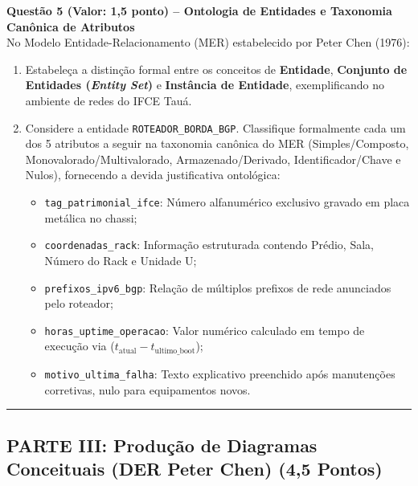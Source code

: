 \documentclass[11pt,a4paper]{article}
\begin{document}
\vspace{0.3cm}
\noindent\textbf{Questão 5 (Valor: 1,5 ponto) -- Ontologia de Entidades e Taxonomia Canônica de Atributos}\\[0.1cm]
No Modelo Entidade-Relacionamento (MER) estabelecido por Peter Chen (1976):
\begin{enumerate}[label=\alph*),itemsep=1pt]
  \item Estabeleça a distinção formal entre os conceitos de \textbf{Entidade}, \textbf{Conjunto de Entidades (\textit{Entity Set})} e \textbf{Instância de Entidade}, exemplificando no ambiente de redes do IFCE Tauá.
  \item Considere a entidade \texttt{ROTEADOR\_BORDA\_BGP}. Classifique formalmente cada um dos 5 atributos a seguir na taxonomia canônica do MER (Simples/Composto, Monovalorado/Multivalorado, Armazenado/Derivado, Identificador/Chave e Nulos), fornecendo a devida justificativa ontológica:
  \begin{itemize}[itemsep=1pt]
    \item \texttt{tag\_patrimonial\_ifce}: Número alfanumérico exclusivo gravado em placa metálica no chassi;
    \item \texttt{coordenadas\_rack}: Informação estruturada contendo Prédio, Sala, Número do Rack e Unidade U;
    \item \texttt{prefixos\_ipv6\_bgp}: Relação de múltiplos prefixos de rede anunciados pelo roteador;
    \item \texttt{horas\_uptime\_operacao}: Valor numérico calculado em tempo de execução via ($t_{\text{atual}} - t_{\text{ultimo\_boot}}$);
    \item \texttt{motivo\_ultima\_falha}: Texto explicativo preenchido após manutenções corretivas, nulo para equipamentos novos.
  \end{itemize}
\end{enumerate}

\vspace{0.4cm}
\hrule
\vspace{0.4cm}

\subsection*{PARTE III: Produção de Diagramas Conceituais (DER Peter Chen) (4,5 Pontos)}
\end{document}

